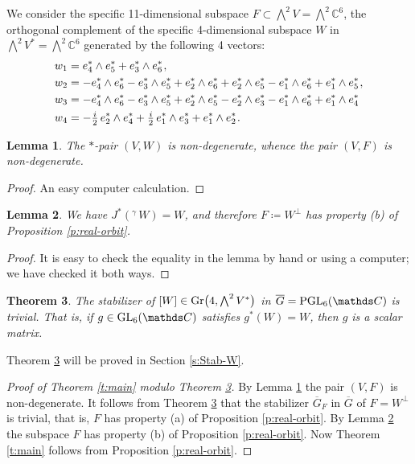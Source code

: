 \documentclass[11pt]{amsart}
\theoremstyle{plain}
\newtheorem{theorem}{Theorem}[section]
\newtheorem{lemma}[theorem]{Lemma}
\theoremstyle{definition}
\newcommand{\hs}{\kern 0.8pt}
\newcommand{\C}{{\mathds C}}
\newcommand{\GL}{{\rm GL}}
\newcommand{\upgam}{{{}^\gamma\!}}
\newcommand{\ol}{\overline}
\newcommand{\PGL}{{\rm PGL}}
\newcommand{\Gr}{{\rm Gr}}
\renewcommand{\Lambda}{\textstyle\bigwedge}
\begin{document}
We consider the specific 11-dimensional subspace $F\subset \Lambda^2 V=\Lambda^2\C^6$,
the orthogonal complement of the specific 4-dimensional subspace $W$ in $\Lambda^2 V^*=\Lambda^2 \C^6$
generated by the following 4 vectors:
\begin{equation}\label{e:W}
\begin{aligned}
&w_1=e_4^*\wedge e_5^*+e_3^*\wedge e_6^*\hs,\\
&w_2=-e_4^*\wedge e_6^*-e_3^*\wedge e_5^*+e_2^*\wedge e_6^*
+e_2^*\wedge e_5^*-e_1^*\wedge e_6^*+e_1^*\wedge e_5^*\hs,\\
&w_3=-e_4^*\wedge e_6^*-e_3^*\wedge e_5^*+e_2^*\wedge e_5^*
-e_2^*\wedge e_3^*-e_1^*\wedge e_6^*+e_1^*\wedge e_4^*\hs\\
&w_4=-\tfrac{i}{2}\,e_2^*\wedge e_4^*+\tfrac{i}{2}\,e_1^*\wedge e_3^*
+e_1^*\wedge e_2^*\hs.
\end{aligned}
\end{equation}


\begin{lemma}\label{l:non-deg}
The $*$-pair $(V,W)$ is non-degenerate, whence the pair $(V,F)$ is non-degenerate.
\end{lemma}

\begin{proof}
An easy computer calculation.
\end{proof}

\begin{lemma}\label{l:(b)}
We have
$J^*(\upgam\, W)= W$, and therefore $F\coloneqq W^\bot$
has property (b) of Proposition \ref{p:real-orbit}.
\end{lemma}

\begin{proof}
It is easy to check the equality in the lemma  by hand or using a computer; we have checked it both ways.
\end{proof}

\begin{theorem}\label{t:Stab}
The stabilizer of $[W]\in\Gr\big(4,\Lambda^2V^*\big)$ in $\ol G=\PGL_6(\C)$ is trivial.  That is, if
$g\in\GL_6(\C)$ satisfies $g^*(W)=W$, then $g$ is a scalar matrix.
\end{theorem}

Theorem \ref{t:Stab} will be proved in Section \ref{s:Stab-W}.

\begin{proof}[Proof of Theorem \ref{t:main} modulo Theorem \ref{t:Stab}]
By Lemma \ref{l:non-deg} the pair $(V,F)$ is non-degenerate.
It follows from Theorem \ref{t:Stab}
that the stabilizer  $\ol G_F$ in $\ol G$ of  $F=W^\bot$ is trivial,
that is, $F$ has property (a) of Proposition \ref{p:real-orbit}.
By Lemma \ref{l:(b)} the subspace  $F$ has property (b) of Proposition \ref{p:real-orbit}.
Now Theorem \ref{t:main} follows from Proposition \ref{p:real-orbit}.
\end{proof}
\end{document}
